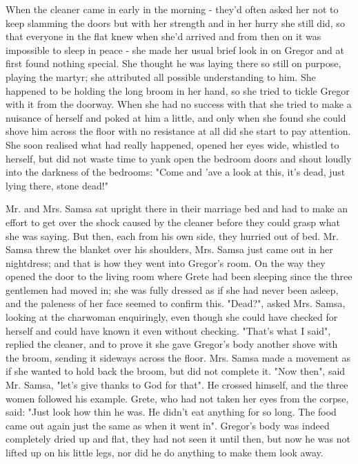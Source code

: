 \documentclass[12pt]{book}
\begin{document}
    When the cleaner came in early in the morning - they'd often asked her not to keep slamming the doors but with her strength and in her hurry she still did, so that everyone in the flat knew when she'd arrived and from then on it was impossible to sleep in peace - she made her usual brief look in on Gregor and at first found nothing special. She thought he was laying there so still on purpose, playing the martyr; she attributed all possible understanding to him. She happened to be holding the long broom in her hand, so she tried to tickle Gregor with it from the doorway. When she had no success with that she tried to make a nuisance of herself and poked at him a little, and only when she found she could shove him across the floor with no resistance at all did she start to pay attention. She soon realised what had really happened, opened her eyes wide, whistled to herself, but did not waste time to yank open the bedroom doors and shout loudly into the darkness of the bedrooms: "Come and 'ave a look at this, it's dead, just lying there, stone dead!"

    Mr. and Mrs. Samsa sat upright there in their marriage bed and had to make an effort to get over the shock caused by the cleaner before they could grasp what she was saying. But then, each from his own side, they hurried out of bed. Mr. Samsa threw the blanket over his shoulders, Mrs. Samsa just came out in her nightdress; and that is how they went into Gregor's room. On the way they opened the door to the living room where Grete had been sleeping since the three gentlemen had moved in; she was fully dressed as if she had never been asleep, and the paleness of her face seemed to confirm this. "Dead?", asked Mrs. Samsa, looking at the charwoman enquiringly, even though she could have checked for herself and could have known it even without checking. "That's what I said", replied the cleaner, and to prove it she gave Gregor's body another shove with the broom, sending it sideways across the floor. Mrs. Samsa made a movement as if she wanted to hold back the broom, but did not complete it. "Now then", said Mr. Samsa, "let's give thanks to God for that". He crossed himself, and the three women followed his example. Grete, who had not taken her eyes from the corpse, said: "Just look how thin he was. He didn't eat anything for so long. The food came out again just the same as when it went in". Gregor's body was indeed completely dried up and flat, they had not seen it until then, but now he was not lifted up on his little legs, nor did he do anything to make them look away.
\end{document}
